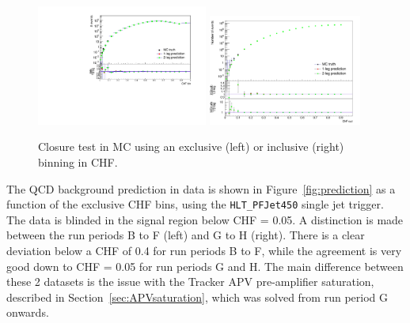 \begin{figure}[ht]
  \includegraphics[width=0.5\textwidth]{figures/closure_test_QCD_exclusive_filters.pdf}\hspace{.2cm}%
  \includegraphics[width=0.45\textwidth]{figures/closure_test_QCD_filters.png}\hfill
  \caption{Closure test in MC using an exclusive (left) or inclusive (right) binning in CHF.}
  \label{fig:closuretest}
\end{figure}

The \acs{QCD} background prediction in data is shown in Figure~\ref{fig:prediction} as a function of the exclusive CHF bins, using the \texttt{HLT\_PFJet450} single jet trigger. The data is blinded in the signal region below CHF = 0.05. A distinction is made between the run periods B to F (left) and G to H (right). There is a clear deviation below a CHF of 0.4 for run periods B to F, while the agreement is very good down to CHF = 0.05 for run periods G and H. The main difference between these 2 datasets is the issue with the Tracker APV pre-amplifier saturation, described in Section~\ref{sec:APVsaturation}, which was solved from run period G onwards.

